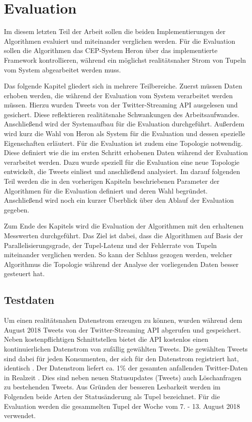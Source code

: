 \chapter{Evaluation}

Im diesem letzten Teil der Arbeit sollen die beiden Implementierungen der Algorithmen evaluiert und miteinander verglichen werden.
Für die Evaluation sollen die Algorithmen das CEP-System Heron über das implementierte Framework kontrollieren, während ein möglichst realitätsnaher Strom von Tupeln vom System abgearbeitet werden muss.

Das folgende Kapitel gliedert sich in mehrere Teilbereiche.
Zuerst müssen Daten erhoben werden, die während der Evaluation vom System verarbeitet werden müssen.
Hierzu wurden Tweets von der Twitter-Streaming API ausgelesen und gesichert.
Diese reflektieren realitätsnahe Schwankungen des Arbeitsaufwandes.
Anschließend wird der Systemaufbau für die Evaluation durchgeführt.
Außerdem wird kurz die Wahl von Heron als System für die Evaluation und dessen spezielle Eigenschaften erläutert.
Für die Evaluation ist zudem eine Topologie notwendig.
Diese definiert wie die im ersten Schritt erhobenen Daten während der Evaluation verarbeitet werden.
Dazu wurde speziell für die Evaluation eine neue Topologie entwickelt, die Tweets einliest und anschließend analysiert.
Im darauf folgenden Teil werden die in den vorherigen Kapiteln beschriebenen Parameter der Algorithmen für die Evaluation definiert und deren Wahl begründet.
Anschließend wird noch ein kurzer Überblick über den Ablauf der Evaluation gegeben.

Zum Ende des Kapitels wird die Evaluation der Algorithmen mit den erhaltenen Messwerten  durchgeführt.
Das Ziel ist dabei, dass die Algorithmen auf Basis der Parallelisierungsgrade, der Tupel-Latenz und der Fehlerrate von Tupeln miteinander verglichen werden.
So kann der Schluss gezogen werden, welcher Algorithmus die Topologie während der Analyse der vorliegenden Daten besser gesteuert hat.


\section{Testdaten}
Um einen realitätsnahen Datenstrom erzeugen zu können, wurden während dem August 2018 Tweets von der Twitter-Streaming API abgerufen und gespeichert.
Neben kostenpflichtigen Schnittstellen bietet die API kostenlos einen kontinuierlichen Datenstrom von zufällig gewählten Tweets.
Die gewählten Tweets sind dabei für jeden Konsumenten, der sich für den Datenstrom registriert hat, identisch \cite{noauthor_get_nodate}.
Der Datenstrom liefert ca. 1\% der gesamten anfallenden Twitter-Daten in Realzeit \cite{noauthor_how_2017}.
Dies sind neben neuen Statusupdates (Tweets) auch Löschanfragen zu bestehenden Tweets.
Aus Gründen der besseren Lesbarkeit werden im Folgenden beide Arten der Statusänderung als Tupel bezeichnet.
Für die Evaluation werden die gesammelten Tupel der Woche vom 7. - 13. August 2018 verwendet.

